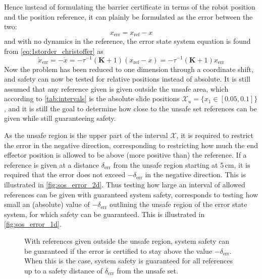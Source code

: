 Hence instead of formulating the barrier certificate in terms of the robot position and the position reference, it can plainly be formulated as the error between the two:
\begin{equation*}
x_\text{err}=x_\text{ref}-x
\end{equation*}
and with no dynamics in the reference, the error state system equation is found from \autoref{eq:1storder_christoffer} as
\begin{equation}
\dot{x}_\text{err} = -\dot{x} = -\tau^{-1}(\mathbf{K}+1)(x_\text{ref}-x) = -\tau^{-1}(\mathbf{K}+1)x_\text{err}
\end{equation}
Now the problem has been reduced to one dimension  through a coordinate shift, and safety can now be tested for relative positions instead of absolute. It is still assumed that any reference given is given outside the unsafe area, which according to \autoref{tab:intervals} is the absolute slide positions $\mathcal{X}_u=\{x_1\in[0.05,0.1]\}$, and it is still the goal to determine how close to the unsafe set references can be given while still guaranteeing safety.

As the unsafe region is the upper part of the interval $\mathcal{X}$, it is required to restrict the error in the negative direction, corresponding to restricting how much the end effector position is allowed to be above (more positive than) the reference. 
If a reference is given at a distance $\delta_\text{err}$ from the unsafe region starting at 5\,cm, it is required that the error does not exceed $-\delta_\text{err}$ in the negative direction. This is illustrated in \autoref{fig:sos_error_2d}. Thus testing how large an interval of allowed references can be given with guaranteed system safety, corresponds to testing how small an (absolute) value of $-\delta_\text{err}$ outlining the unsafe region of the error state system, for which safety can be guaranteed. This is illustrated in \autoref{fig:sos_error_1d}.



\begin{figure}[b]
\centering
{}%
\hspace{3mm}
%
\hspace{3mm}
%
\caption{With references given outside the unsafe region, system safety can be guaranteed if the error is certified to stay above the value $-\delta_\text{err}$. When this is the case, system safety is guaranteed for all references up to a safety distance of $\delta_\text{err}$ from the unsafe set.}
	\label{fig:sets_error}
\end{figure}


